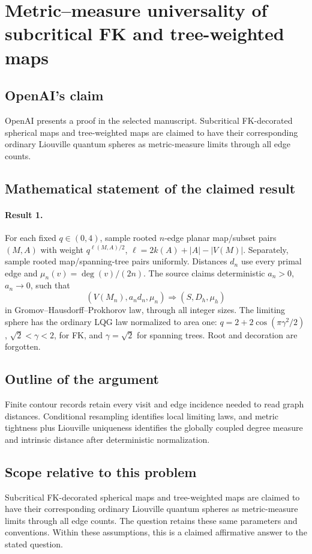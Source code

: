 \documentclass[11pt]{article}
\begin{document}
\section*{Metric–measure universality of subcritical FK and tree-weighted maps}

\subsection{OpenAI's claim}
OpenAI presents a proof in the selected manuscript. Subcritical FK-decorated spherical maps and tree-weighted maps are claimed to have their corresponding ordinary Liouville quantum spheres as metric-measure limits through all edge counts.

\subsection{Mathematical statement of the claimed result}
\paragraph{Result 1.} For each fixed \(q\in(0,4)\), sample rooted \(n\)-edge planar map/subset pairs \((M,A)\) with weight \(q^{\ell(M,A)/2}\), \(\ell=2k(A)+|A|-|V(M)|\). Separately, sample rooted map/spanning-tree pairs uniformly. Distances \(d_n\) use every primal edge and \(\mu_n(v)=\deg(v)/(2n)\). The source claims deterministic \(a_n>0\), \(a_n\to0\), such that
\[
 (V(M_n),a_nd_n,\mu_n)\Longrightarrow(S,D_h,\mu_h)
\]
in Gromov--Hausdorff--Prokhorov law, through all integer sizes. The limiting sphere has the ordinary LQG law normalized to area one: \(q=2+2\cos(\pi\gamma^2/2)\), \(\sqrt2<\gamma<2\), for FK, and \(\gamma=\sqrt2\) for spanning trees. Root and decoration are forgotten.

\subsection{Outline of the argument}
Finite contour records retain every visit and edge incidence needed to read graph distances. Conditional resampling identifies local limiting laws, and metric tightness plus Liouville uniqueness identifies the globally coupled degree measure and intrinsic distance after deterministic normalization.

\subsection{Scope relative to this problem}
Subcritical FK-decorated spherical maps and tree-weighted maps are claimed to have their corresponding ordinary Liouville quantum spheres as metric-measure limits through all edge counts. The question retains these same parameters and conventions. Within these assumptions, this is a claimed affirmative answer to the stated question.
\end{document}
